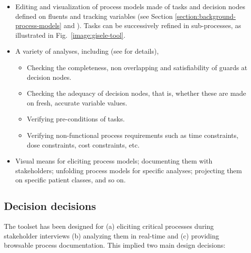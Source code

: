 \begin{itemize}
\item Editing and visualization of process models made of tasks and decision nodes defined on fluents and tracking variables (see Section \ref{section:background-process-models} and \cite{Damas:2009, Damas:2011}). Tasks can be successively refined in sub-processes, as illustrated in Fig.~\ref{image:gisele-tool}.
\item A variety of analyses, including (see \cite{Damas:2011} for details),
\begin{itemize}
\item Checking the completeness, non overlapping and satisfiability of guards at decision nodes.
\item Checking the adequacy of decision nodes, that is, whether these are made on fresh, accurate variable values.
\item Verifying pre-conditions of tasks.
\item Verifying non-functional process requirements such as time constraints, dose constraints, cost constraints, etc.
\end{itemize}
\item Visual means for eliciting process models; documenting them with stakeholders; unfolding process models for specific analyses; projecting them on specific patient classes, and so on.
\end{itemize}

\subsection*{Decision decisions}

The toolset has been designed for (a) eliciting critical processes during stakeholder interviews (b) analyzing them in real-time and (c) providing browsable process documentation. This implied two main design decisions:

